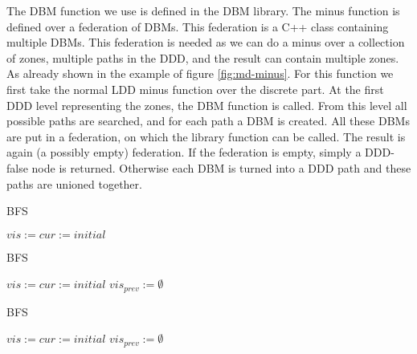 The DBM function we use is defined in the \uppaal{} DBM library. The minus function is defined over a federation of DBMs. This federation is a C++ class containing multiple DBMs. This federation is needed as we can do a minus over a collection of zones, multiple paths in the DDD, and the result can contain multiple zones. As already shown in the example of figure \ref{fig:md-minus}. For this function we first take the normal LDD minus function over the discrete part. At the first DDD level representing the zones, the DBM function is called. From this level all possible paths are searched, and for each path a DBM is created. All these DBMs are put in a federation, on which the library function can be called. The result is again (a possibly empty) federation. If the federation is empty, simply a DDD-false node is returned. Otherwise each DBM is turned into a DDD path and these paths are unioned together.

\begin{algorithm}
\caption{BFS}\label{alg:bfs-orig}
\begin{algorithmic}[1]
	\State $vis := cur := initial$
	\EndWhile
	
\EndProcedure	
\end{algorithmic}
\end{algorithm}

\begin{algorithm}
\caption{BFS}\label{alg:bfs-check}
\begin{algorithmic}[1]
	\State $vis := cur := initial$
	\State $vis_{prev} := \emptyset$
	\EndWhile
	
\EndProcedure	
\end{algorithmic}
\end{algorithm}

\begin{algorithm}
\caption{BFS}\label{alg:bfs-no-minus}
\begin{algorithmic}[1]
	\State $vis := cur := initial$
	\State $vis_{prev} := \emptyset$
	\EndWhile
	
\EndProcedure	
\end{algorithmic}
\end{algorithm}